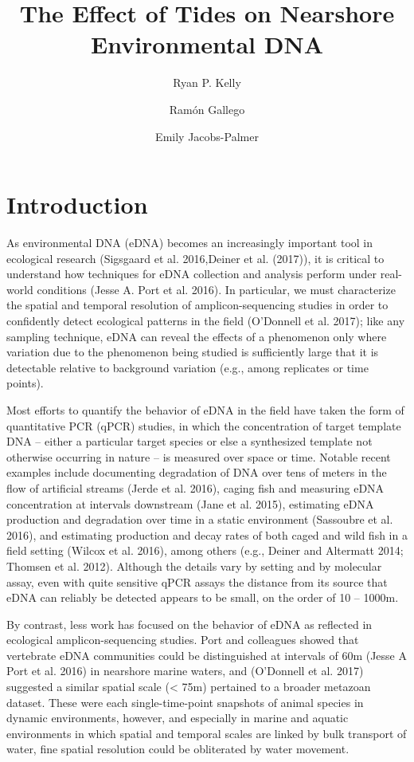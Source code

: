 \documentclass[fleqn,10pt,lineno]{wlpeerj} %
\title{The Effect of Tides on Nearshore Environmental DNA}
\author{Ryan P. Kelly}
\author{Ram\'{o}n Gallego}
\author{Emily Jacobs-Palmer}
\affil{University of Washington, School of Marine and Environmental Affairs, Seattle, Washington USA}
\begin{document}
\flushbottom
\maketitle
\thispagestyle{empty}

\section{Introduction}\label{introduction}

As environmental DNA (eDNA) becomes an increasingly important tool in
ecological research (Sigsgaard et al. 2016,Deiner et al. (2017)), it is
critical to understand how techniques for eDNA collection and analysis
perform under real-world conditions (Jesse A. Port et al. 2016). In
particular, we must characterize the spatial and temporal resolution of
amplicon-sequencing studies in order to confidently detect ecological
patterns in the field (O'Donnell et al. 2017); like any sampling
technique, eDNA can reveal the effects of a phenomenon only where
variation due to the phenomenon being studied is sufficiently large that
it is detectable relative to background variation (e.g., among
replicates or time points).

Most efforts to quantify the behavior of eDNA in the field have taken
the form of quantitative PCR (qPCR) studies, in which the concentration
of target template DNA -- either a particular target species or else a
synthesized template not otherwise occurring in nature -- is measured
over space or time. Notable recent examples include documenting
degradation of DNA over tens of meters in the flow of artificial streams
(Jerde et al. 2016), caging fish and measuring eDNA concentration at
intervals downstream (Jane et al. 2015), estimating eDNA production and
degradation over time in a static environment (Sassoubre et al. 2016),
and estimating production and decay rates of both caged and wild fish in
a field setting (Wilcox et al. 2016), among others (e.g., Deiner and
Altermatt 2014; Thomsen et al. 2012). Although the details vary by
setting and by molecular assay, even with quite sensitive qPCR assays
the distance from its source that eDNA can reliably be detected appears
to be small, on the order of 10 -- 1000m.

By contrast, less work has focused on the behavior of eDNA as reflected
in ecological amplicon-sequencing studies. Port and colleagues showed
that vertebrate eDNA communities could be distinguished at intervals of
60m (Jesse A Port et al. 2016) in nearshore marine waters, and
(O'Donnell et al. 2017) suggested a similar spatial scale (\textless{}
75m) pertained to a broader metazoan dataset. These were each
single-time-point snapshots of animal species in dynamic environments,
however, and especially in marine and aquatic environments in which
spatial and temporal scales are linked by bulk transport of water, fine
spatial resolution could be obliterated by water movement.
\end{document}

